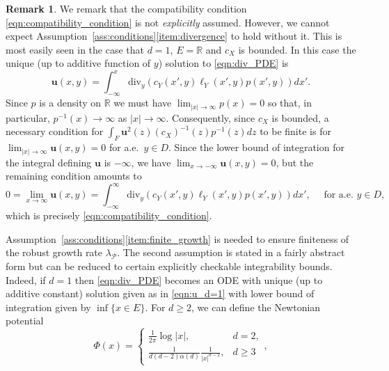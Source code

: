 \documentclass{article}
\theoremstyle{plain}
\theoremstyle{definition}
\newtheorem{remark}[lem]{Remark}
\newcommand{\R}{\mathbb{R}}
\newcommand{\Pcal}{{\mathcal P}}
\numberwithin{lem}{section}
\begin{document}
\begin{remark} \label{rem:u}
    We remark that the compatibility condition \eqref{eqn:compatibility_condition} is not \emph{explicitly} assumed. However, we cannot expect Assumption~\ref{ass:conditions}\ref{item:divergence} to hold without it. This is most easily seen in the case that $d=1$, $E = \R$ and $c_X$ is bounded. In this case the unique (up to additive function of $y$) solution to \eqref{eqn:div_PDE} is \begin{equation} \label{eqn:u_d=1}
        \mathbf{u}(x,y) = \int_{-\infty}^x \mathrm{div}_y(c_Y(x',y)\ell_Y(x',y)p(x',y))dx'.
    \end{equation}Since $p$ is a density on $\R$ we must have $\lim_{|x|\to \infty} p(x) = 0$ so that, in particular, $p^{-1}(x) \to \infty$ as $|x| \to \infty$. Consequently, since $c_X$ is bounded, a necessary condition for $\int_F \mathbf{u}^2(z)(c_X)^{-1}(z)p^{-1}(z)dz$ to be finite is for $\lim_{|x| \to \infty} \mathbf{u}(x,y) = 0$ for a.e.\ $y \in D$. Since the lower bound of integration for the integral defining $\mathbf{u}$ is $-\infty$, we have $\lim_{x \to -\infty} \mathbf{u}(x,y) = 0$, but the remaining condition amounts to
\[0 = \lim_{x \to \infty} \mathbf{u}(x,y) = \int_{-\infty}^\infty \mathrm{div}_y(c_Y(x',y)\ell_Y(x',y)p(x',y))dx', \quad \text{ for a.e.\ } y \in D,\]
which is precisely \eqref{eqn:compatibility_condition}.
\end{remark}
Assumption~\ref{ass:conditions}\ref{item:finite_growth} is needed to ensure finiteness of the robust growth rate $\lambda_\Pcal$. The second assumption is stated in a fairly abstract form but can be reduced to certain explicitly checkable integrability bounds. Indeed, if $d = 1$ then \eqref{eqn:div_PDE} becomes an ODE with unique (up to additive constant) solution given as in \eqref{eqn:u_d=1} with lower bound of integration given by $\inf\{x \in E\}$. For $d \geq 2$, we can define the Newtonian potential 
\[\Phi(x) = \begin{cases}
    \frac{1}{2\pi}\log|x|, & d = 2, \\
    \frac{1}{d(d-2)\alpha(d)}\frac{1}{|x|^{d-2}}, & d \geq 3
\end{cases},\]
\end{document}
